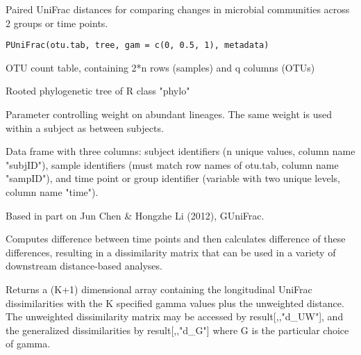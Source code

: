 \documentclass[a4paper]{book}
\begin{document}
%
\begin{Description}\relax
Paired UniFrac distances for comparing changes in
microbial communities across 2 groups or time points.
\end{Description}
%
\begin{Usage}
\begin{verbatim}
PUniFrac(otu.tab, tree, gam = c(0, 0.5, 1), metadata)
\end{verbatim}
\end{Usage}
%
\begin{Arguments}
\begin{ldescription}
\item[\code{otu.tab}] OTU count table, containing 2*n rows (samples) and q columns (OTUs)

\item[\code{tree}] Rooted phylogenetic tree of R class "phylo"

\item[\code{gam}] Parameter controlling weight on abundant lineages. The same weight is used within a subject as between subjects.

\item[\code{metadata}] Data frame with three columns: subject identifiers (n unique values, column name "subjID"), 
sample identifiers (must match row names of otu.tab, column name "sampID"), 
and time point or group identifier (variable with two unique levels, column name "time").
\end{ldescription}
\end{Arguments}
%
\begin{Details}\relax
Based in part on Jun Chen \& Hongzhe Li (2012), GUniFrac.

Computes difference between time points and then calculates
difference of these differences, resulting in a dissimilarity
matrix that can be used in a variety of downstream 
distance-based analyses.
\end{Details}
%
\begin{Value}
Returns a (K+1) dimensional array containing the longitudinal UniFrac dissimilarities 
with the K specified gamma values plus the unweighted distance. The unweighted dissimilarity 
matrix may be accessed by result[,,"d\_UW"], and the generalized dissimilarities by result[,,"d\_G"] 
where G is the particular choice of gamma.
\end{Value}
\end{document}
